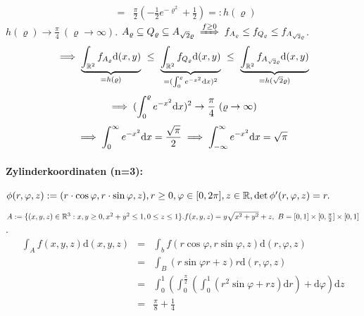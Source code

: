 \documentclass{article}
\begin{document}
\begin{beispiele}
\begin{eqnarray*}
&=&\frac{\pi}{2}(-\frac{1}{2}e^{-\varrho^2}+\frac{1}{2}) =: h(\varrho)
\end{eqnarray*}
$h(\varrho)\to\frac{\pi}{4}\ (\varrho\to\infty)$. $A_\varrho\subseteq Q_\varrho\subseteq A_{\sqrt{2}\varrho}\folgtwegen{f\ge 0}f_{A_\varrho}\le f_{Q_\varrho}\le f_{A_{\sqrt{2}\varrho}}$.
\[
	\folgt
	\underbrace{\int_{\MdR^2}f_{A_\varrho}\text{d}(x,y)}_{=h(\varrho)}\ \le\ 
	\underbrace{\int_{\MdR^2}f_{Q_\varrho}\text{d}(x,y)}_{=(\int_0^\varrho e^{-x^2}\text{d}x)^2}\ \le\ 
	\underbrace{\int_{\MdR^2}f_{A_{\sqrt{2}\varrho}}\text{d}(x,y)}_{=h(\sqrt{2}\varrho)}
\]
\[
	\folgt
	(\int_0^\varrho e^{-x^2}\text{d}x)^2\to\frac{\pi}{4}\ (\varrho\to\infty)
\]
\[
	\implies
	\int_0^\infty e^{-x^2}\text{d}x=\frac{\sqrt{\pi}}{2}\implies\int_{-\infty}^\infty e^{-x^2}\text{d}x=\sqrt{\pi}
\]
\end{beispiele}

\paragraph{Zylinderkoordinaten (n=3):} $ $\\
$\phi(r,\varphi,z):=(r\cdot \cos\varphi, r\cdot\sin\varphi, z), r\ge 0, \varphi\in[0,2\pi], z\in\mathbb{R}, \det\phi'(r,\varphi,z)=r.$
\begin{beispiel}
$A:=\{(x,y,z)\in\MdR^3: x,y\ge 0, x^2+y^2\le 1, 0\le z\le 1\}.\\
f(x,y,z)=y\sqrt{x^2+y^2}+z,\ B=[0,1]\times[0,\frac{\pi}{2}]\times[0,1]$. 
\begin{eqnarray*}
\int_A f(x,y,z)\text{d}(x,y,z) & = & \int_b f(r\cos\varphi, r\sin\varphi,z)\text{d}(r,\varphi,z)\\
& = &\int_B(r\sin\varphi r+z)r\text{d}(r,\varphi,z)\\
& = &\int_0^1(\int_0^{\frac{\pi}{2}}(\int_0^1(r^2\sin\varphi+rz)\text{d}r)+\text{d}\varphi)\text{d}z\\
& = & \frac{\pi}{8}+\frac{1}{4}
\end{eqnarray*}
\end{beispiel}
\end{document}
